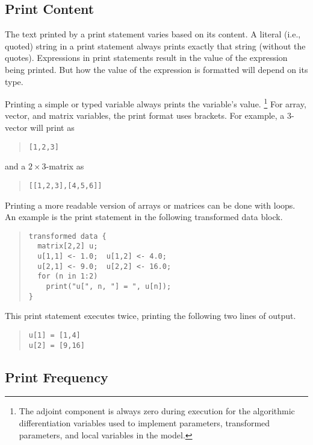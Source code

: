 \subsection{Print Content}

The text printed by a print statement varies based on its content.  A
literal (i.e., quoted) string in a print statement always prints
exactly that string (without the quotes).  Expressions in print
statements result in the value of the expression being printed.
But how the value of the expression is formatted will depend on its type.

Printing a simple  or  typed variable always
prints the variable's value.%
%
\footnote{The adjoint component is always zero during execution for
  the algorithmic differentiation variables used to implement
  parameters, transformed parameters, and local variables in the model.}
%
For array, vector, and matrix variables, the print format uses
brackets.  For example, a 3-vector will print as
%
\begin{quote}
\begin{Verbatim}
[1,2,3]
\end{Verbatim}
\end{quote}
%
and a $2 \times 3$-matrix as 
%
\begin{quote}
\begin{Verbatim}
[[1,2,3],[4,5,6]]
\end{Verbatim}
\end{quote}
%

Printing a more readable version of arrays or matrices can be done
with loops.  An example is the print statement in the following
transformed data block.
%
\begin{quote}
\begin{Verbatim}
transformed data {
  matrix[2,2] u;  
  u[1,1] <- 1.0;  u[1,2] <- 4.0;    
  u[2,1] <- 9.0;  u[2,2] <- 16.0;
  for (n in 1:2)
    print("u[", n, "] = ", u[n]);
}
\end{Verbatim}
\end{quote}
%
This print statement executes twice, printing the following two lines
of output.
%
\begin{quote}
\begin{Verbatim}
u[1] = [1,4]
u[2] = [9,16]
\end{Verbatim}
\end{quote}



\subsection{Print Frequency}

